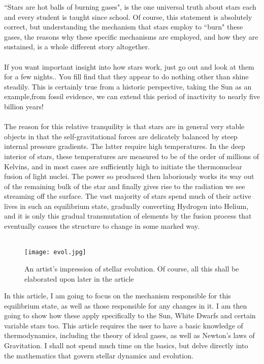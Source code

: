 ``Stars are hot balls of burning gases", is the one universal truth about stars each and every student is taught since school. Of course, this statement is absolutely correct, but understanding the mechanism that stars employ to ``burn" these gases, the reasons why these specific mechanisms are employed, and how they are sustained, is a whole different story altogether. \\\\
If you want important insight into how stars work, just go out and look at them for a few nights.. You fill find that they appear to do nothing other than shine steadily. This is certainly true from a historic perspective, taking the Sun as an example,from fossil evidence, we can extend this period of inactivity to nearly five billion years! \\\\
The reason for this relative tranquility is that stars are in general very stable objects in that the self-gravitational forces are delicately balanced by steep internal pressure gradients. The latter require high temperatures. In the deep interior of stars, these temperatures are measured to be of the order of millions of Kelvins, and in most cases are sufficiently high to initiate the thermonuclear fusion of light nuclei. The power so produced then laboriously works its way out of the remaining bulk of the star and finally gives rise to the radiation we see streaming off the surface. The vast majority of stars spend much of their active lives in such an equilibrium state, gradually converting Hydrogen into Helium, and it is only this gradual transmutation of elements by the fusion process that eventually causes the structure to change in some marked way.\\\\

\begin{figure}[H]
    \centering
    \color{white}
    \texttt{[image: evol.jpg]}
    \caption{\color{white}An artist's impression of stellar evolution. Of course, all this shall be elaborated upon later in the article}
    \label{fig:my_label}
\end{figure}
\noindent
In this article, I am going to focus on the mechanism responsible for this equilibrium state, as well as those responsible for any changes in it. I am then going to show how these apply specifically to the Sun, White Dwarfs and certain variable stars too. This article requires the user to have a basic knowledge of thermodynamics, including the theory of ideal gases, as well as Newton's laws of Gravitation. I shall not spend much time on the basics, but delve directly into the mathematics that govern stellar dynamics and evolution. 
